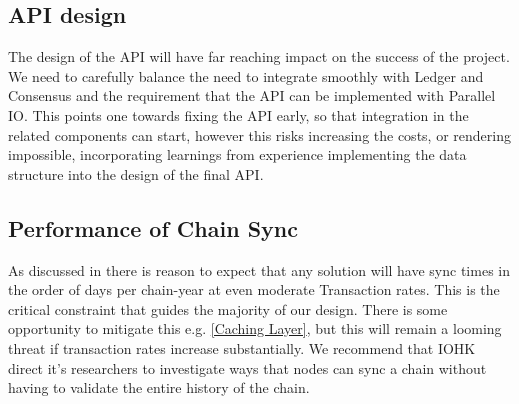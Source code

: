 \documentclass[11pt,a4paper]{article}
\begin{document}
\subsection{API design}
The design of the API will have far reaching impact on the success of the
project. We need to carefully balance the need to integrate smoothly with Ledger
and Consensus and the requirement that the API can be implemented with Parallel
IO. This points one towards fixing the API early, so that integration in the
related components can start, however this risks increasing the costs, or
rendering impossible,  incorporating learnings from experience implementing the
data structure into the design of the final API.

\subsection{Performance of Chain Sync}
As discussed in  there is reason to expect that any solution
will have sync times in the order of days per chain-year at even moderate
Transaction rates. This is the critical constraint that guides the majority of
our design. There is some opportunity to mitigate this e.g. \ref{Caching Layer},
but this will remain a looming threat if transaction rates increase
substantially. We recommend that IOHK direct it's researchers to investigate
ways that nodes can sync a chain without having to validate the entire history
of the chain.



\end{document}
